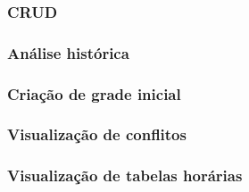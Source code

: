 \subsubsection{CRUD} \label{sssec:CRUD}

\subsubsection{Análise histórica} \label{sssec:Análise histórica}

\subsubsection{Criação de grade inicial} \label{sssec:Criação de grade inicial}

\subsubsection{Visualização de conflitos} \label{sssec:Visualização de conflitos}

\subsubsection{Visualização de tabelas horárias} \label{sssec:Visualização de tabelas horárias}
